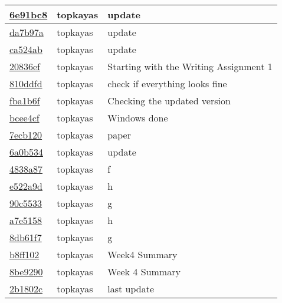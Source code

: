 \begin{tabular}{l l l}
\href{git@github.com:topkayas/CS444/commit/6e91bc83dea6dbe8f7916dccd0ed4969bbcdf2c4}{6e91bc8} & topkayas & update\\\hline
\href{git@github.com:topkayas/CS444/commit/da7b97ae1b38f767f211432d63b1cb1535208377}{da7b97a} & topkayas & update\\\hline
\href{git@github.com:topkayas/CS444/commit/ca524ab7c929dc1e7d0e977ce1d2e19452e40718}{ca524ab} & topkayas & update\\\hline
\href{git@github.com:topkayas/CS444/commit/20836ef8a96f97bfcfe0d8a01f4e0aeaaeb7438b}{20836ef} & topkayas & Starting with the Writing Assignment 1\\\hline
\href{git@github.com:topkayas/CS444/commit/810ddfde1cd5aff5b3973e41f92779faff0bde06}{810ddfd} & topkayas & check if everything looks fine\\\hline
\href{git@github.com:topkayas/CS444/commit/fba1b6f752edb17e9a05c9e74bc2b4df7f14f1c8}{fba1b6f} & topkayas & Checking the updated version\\\hline
\href{git@github.com:topkayas/CS444/commit/bcee4cf40b3a2945e795c81d45184fbc51806cd7}{bcee4cf} & topkayas & Windows done\\\hline
\href{git@github.com:topkayas/CS444/commit/7ecb120b31b8d85b1c441e9fcc72113e5bc0dcc5}{7ecb120} & topkayas & paper\\\hline
\href{git@github.com:topkayas/CS444/commit/6a0b5342ec1ed581ddbe751da36483ff4a391cb1}{6a0b534} & topkayas & update\\\hline
\href{git@github.com:topkayas/CS444/commit/4838a87c6da32de64b3434de11996b7fb3c2ded6}{4838a87} & topkayas & f\\\hline
\href{git@github.com:topkayas/CS444/commit/e522a9db42f957b862b5a4a6883dc96ebe12a5af}{e522a9d} & topkayas & h\\\hline
\href{git@github.com:topkayas/CS444/commit/90c55337881a81dc960a6e5cce07e2aadc7dca57}{90c5533} & topkayas & g\\\hline
\href{git@github.com:topkayas/CS444/commit/a7e5158a71a2e21d8965232d7f966d84c58b4925}{a7e5158} & topkayas & h\\\hline
\href{git@github.com:topkayas/CS444/commit/8db61f790d72db60a0079bdea7ea90b2c7db6872}{8db61f7} & topkayas & g\\\hline
\href{git@github.com:topkayas/CS444/commit/b8ff1022d12b6742cebcb54378369ff782dac89f}{b8ff102} & topkayas & Week4 Summary\\\hline
\href{git@github.com:topkayas/CS444/commit/8be92908e659605ebe7f457758fb51036d05dbef}{8be9290} & topkayas & Week 4 Summary\\\hline
\href{git@github.com:topkayas/CS444/commit/2b1802c27d1698a16d0af379c06764c9615671ca}{2b1802c} & topkayas & last update\\\hline\end{tabular}

